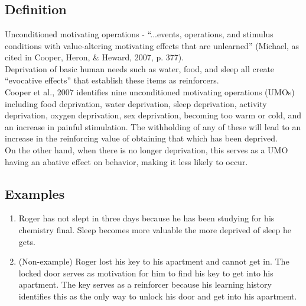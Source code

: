 \clearpage \section{\fourFKTwentySix{}}
\subsection{Definition}
Unconditioned motivating operations - ``...events, operations, and stimulus conditions with value-altering motivating effects that are unlearned'' (Michael, as cited in Cooper, Heron, \& Heward, 2007, p. 377).\\
Deprivation of basic human needs such as water, food, and sleep all create ``evocative effects'' that establish these items as reinforcers.\\

Cooper et al., 2007 identifies nine unconditioned motivating operations (UMOs) including food deprivation, water deprivation, sleep deprivation, activity deprivation, oxygen deprivation, sex deprivation, becoming too warm or cold, and an increase in painful stimulation. The withholding of any of these will lead to an increase in the reinforcing value of obtaining that which has been deprived.\\

On the other hand, when there is no longer deprivation, this serves as a UMO having an abative effect on behavior, making it less likely to occur.
%
\subsection{Examples}
\begin{enumerate}
\item Roger has not slept in three days because he has been studying for his chemistry final. Sleep becomes more valuable the more deprived of sleep he gets. 
\item (Non-example) Roger lost his key to his apartment and cannot get in. The locked door serves as motivation for him to find his key to get into his apartment. The key serves as a reinforcer because his learning history identifies this as the only way to unlock his door and get into his apartment.
%
\end{enumerate}
%

